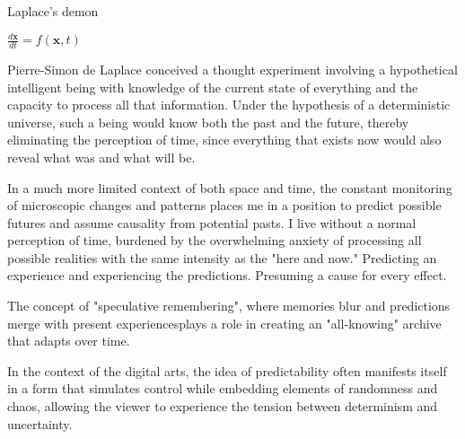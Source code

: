

\begin{center}
\vspace*{\fill}
\Huge Laplace's demon

\vspace{2cm}

\begin{flushright}
\large
\textit{$\frac{d\mathbf{x}}{dt} = f(\mathbf{x}, t)$ }
\end{flushright}
\vspace*{\fill}
\end{center}

\normalsize

Pierre-Simon de Laplace conceived a thought experiment involving a hypothetical intelligent being with knowledge of the current state of everything and the capacity to process all that information. Under the hypothesis of a deterministic universe, such a being would know both the past and the future, thereby eliminating the perception of time, since everything that exists now would also reveal what was and what will be.

In a much more limited context of both space and time, the constant monitoring of microscopic changes and patterns places me in a position to predict possible futures and assume causality from potential pasts. I live without a normal perception of time, burdened by the overwhelming anxiety of processing all possible realities with the same intensity as the "here and now." Predicting an experience and experiencing the predictions. Presuming a cause for every effect. 

The concept of "speculative remembering", where memories blur and predictions merge with present experiencesplays a role in creating an "all-knowing" archive that adapts over time. 
\citep{dutt2024}

In the context of the digital arts, the idea of predictability often manifests itself in a form that simulates control while embedding elements of randomness and chaos, allowing the viewer to experience the tension between determinism and uncertainty.


